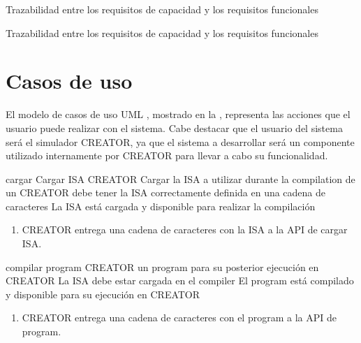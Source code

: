     {Trazabilidad entre los requisitos de capacidad y los requisitos funcionales}

    {Trazabilidad entre los requisitos de capacidad y los requisitos funcionales}

\FloatBarrier

\section{Casos de uso}\label{sec:usecases}

El modelo de casos de uso UML \parencite{UMLSpec}, mostrado en la
, representa las acciones que el usuario puede realizar con
el sistema. Cabe destacar que el usuario del sistema será el simulador CREATOR,
ya que el sistema a desarrollar será un componente utilizado internamente por
CREATOR para llevar a cabo su funcionalidad.


\printuctemplate

\begin{useCase}{cargar}
    {Cargar \gls{ISA}} %
    {CREATOR} %
    {Cargar la \gls{ISA} a utilizar durante la \gls{compilation} de un } %
    {CREATOR debe tener la \gls{ISA} correctamente definida en una cadena de caracteres} %
    {La \gls{ISA} está cargada y disponible para realizar la compilación} %
    \begin{enumerate}[leftmargin=*, topsep=0pt, noitemsep]
        \item CREATOR entrega una cadena de caracteres con la
        \gls{ISA} a la \gls{API} de cargar \gls{ISA}.
    \end{enumerate}
\end{useCase}

\begin{useCase}{compilar}
    { \gls{program}} %
    {CREATOR} %
    { un \gls{program} para su posterior ejecución en CREATOR} %
    {La \gls{ISA} debe estar cargada en el \gls{compiler}} %
    {El \gls{program} está compilado y disponible para su ejecución en CREATOR} %
    \begin{enumerate}[leftmargin=*, topsep=0pt, noitemsep]
        \item CREATOR entrega una cadena de caracteres con el \gls{program}
        a la \gls{API} de  \gls{program}.
    \end{enumerate}
\end{useCase}
